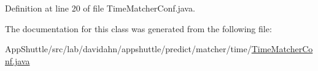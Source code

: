 \-Definition at line 20 of file \-Time\-Matcher\-Conf.\-java.



\-The documentation for this class was generated from the following file\-:\begin{DoxyCompactItemize}
\item 
\-App\-Shuttle/src/lab/davidahn/appshuttle/predict/matcher/time/\hyperlink{_time_matcher_conf_8java}{\-Time\-Matcher\-Conf.\-java}\end{DoxyCompactItemize}
